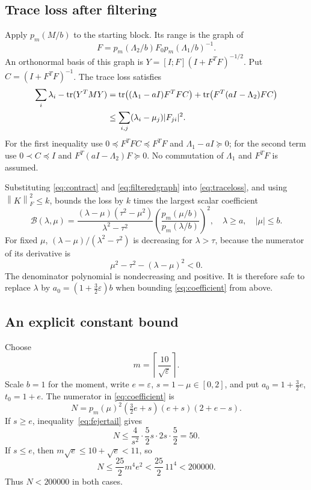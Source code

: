 \documentclass[11pt]{article}
\numberwithin{equation}{section}
\theoremstyle{definition}
\newcommand{\norm}[1]{\left\lVert#1\right\rVert}
\newcommand{\tr}{\operatorname{tr}}
\newcommand{\eps}{\varepsilon}
\begin{document}
\subsection{Trace loss after filtering}
Apply $p_m(M/b)$ to the starting block. Its range is the graph of
\begin{equation}
 F=p_m(\Lambda_2/b)F_0p_m(\Lambda_1/b)^{-1}.
 \label{eq:filteredgraph}
\end{equation}
An orthonormal basis of this graph is
$Y=[I;F](I+F^TF)^{-1/2}$. Put $C=(I+F^TF)^{-1}$. The trace loss satisfies
\begin{align}
 \sum_i\lambda_i-\tr(Y^TMY)
 &=\tr\bigl((\Lambda_1-aI)F^TFC\bigr)
   +\tr\bigl(F^T(aI-\Lambda_2)FC\bigr)\notag\\
 &\le\sum_{i,j}(\lambda_i-\mu_j)|F_{ji}|^2.
 \label{eq:traceloss}
\end{align}
For the first inequality use $0\preceq F^TFC\preceq F^TF$ and
$\Lambda_1-aI\succeq0$; for the second term use $0\prec C\preceq I$ and
$F^T(aI-\Lambda_2)F\succeq0$. No commutation of $\Lambda_1$ and $F^TF$ is
assumed.

Substituting \eqref{eq:contract} and \eqref{eq:filteredgraph} into
\eqref{eq:traceloss}, and using $\norm K_F^2\le k$, bounds the loss by $k$
times the largest scalar coefficient
\begin{equation}
 \mathcal B(\lambda,\mu)=
 \frac{(\lambda-\mu)(\tau^2-\mu^2)}{\lambda^2-\tau^2}
 \left(\frac{p_m(\mu/b)}{p_m(\lambda/b)}\right)^2,
 \quad\lambda\ge a,\quad |\mu|\le b.
 \label{eq:coefficient}
\end{equation}
For fixed $\mu$, $(\lambda-\mu)/(\lambda^2-\tau^2)$ is decreasing for
$\lambda>\tau$, because the numerator of its derivative is
\[
 \mu^2-\tau^2-(\lambda-\mu)^2<0.
\]
The denominator polynomial is nondecreasing and positive. It is therefore
safe to replace $\lambda$ by $a_0=(1+\frac32\eps)b$ when bounding
\eqref{eq:coefficient} from above.

\subsection{An explicit constant bound}
Choose
\begin{equation}
 m=\left\lceil\frac{10}{\sqrt\eps}\right\rceil.
 \label{eq:mchoice}
\end{equation}
Scale $b=1$ for the moment, write $e=\eps$, $s=1-\mu\in[0,2]$, and put
$a_0=1+\frac32e$, $t_0=1+e$. The numerator in \eqref{eq:coefficient} is
\[
 N=p_m(\mu)^2(\tfrac32e+s)(e+s)(2+e-s).
\]
If $s\ge e$, inequality~\eqref{eq:fejertail} gives
\[
 N\le\frac4{s^2}\cdot\frac52s\cdot2s\cdot\frac52=50.
\]
If $s\le e$, then $m\sqrt e\le10+\sqrt e<11$, so
\[
 N\le\frac{25}{2}m^4e^2
 <\frac{25}{2}\,11^4<200000.
\]
Thus $N<200000$ in both cases.
\end{document}
